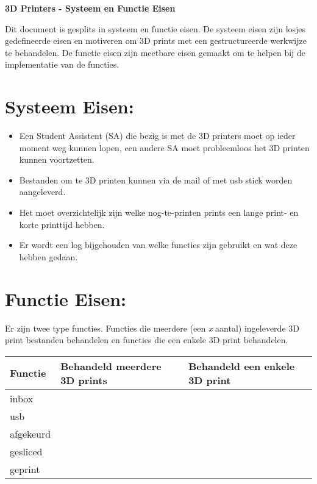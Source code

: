 \documentclass{article}
\newcommand{\cmark}{\textcolor{green}{\ding{51}}}%
\newcommand{\xmark}{\textcolor{red}{\ding{55}}}%
\begin{document}
\pagestyle{empty}

\begin{center}
  \Large \textbf{3D Printers - Systeem en Functie Eisen}
\end{center}

\noindent Dit document is gesplits in systeem en functie eisen. De systeem eisen zijn losjes gedefineerde eisen en motiveren om 3D prints met een gestructureerde werkwijze te behandelen. De functie eisen zijn meetbare eisen gemaakt om te helpen bij de implementatie van de functies.

\section*{Systeem Eisen:}
\begin{itemize}
  \item Een Student Assistent (SA) die bezig is met de 3D printers moet op ieder moment weg kunnen lopen, een andere SA moet probleemloos het 3D printen kunnen voortzetten.
  \item Bestanden om te 3D printen kunnen via de mail of met usb stick worden aangeleverd.
  \item Het moet overzichtelijk zijn welke nog-te-printen prints een lange print- en korte printtijd hebben.
  \item Er wordt een log bijgehouden van welke functies zijn gebruikt en wat deze hebben gedaan. 
\end{itemize}

\section*{Functie Eisen:}
Er zijn twee type functies. Functies die meerdere (een \textit{x} aantal) ingeleverde 3D print bestanden behandelen en functies die een enkele 3D print behandelen. 

\begin{table}[H]
    \centering
    \begin{tabular}%
    {>{\raggedright\arraybackslash}p{}%
    |>{\centering\arraybackslash}p{}
    |>{\centering\arraybackslash}p{}}
    \rowcolor{myblue} Functie & Behandeld meerdere 3D prints & Behandeld een enkele 3D print\\\hline
    inbox &\cmark&\xmark\\
    usb &\xmark&\cmark\\
    afgekeurd &\xmark&\cmark\\
    gesliced &\xmark&\cmark\\
    geprint &\xmark&\cmark\\
  \end{tabular}
\end{table}
\end{document}

